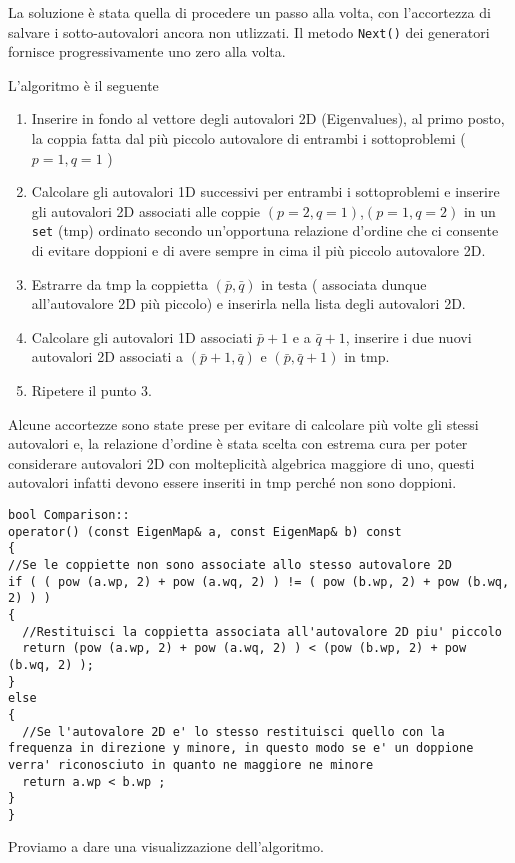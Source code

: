 La soluzione \`e stata quella di procedere un passo alla volta, con l'accortezza di salvare i sotto-autovalori ancora non utlizzati. 
Il metodo \texttt{Next()} dei generatori fornisce progressivamente uno 
zero alla volta.

L'algoritmo \`e il seguente
\begin{enumerate}
 \item Inserire in fondo al vettore degli autovalori 2D (Eigenvalues), al primo posto, la coppia fatta dal pi\`u piccolo autovalore di entrambi i sottoproblemi ( $p=1,q=1$ )
 \item Calcolare gli autovalori 1D successivi  per entrambi i sottoproblemi e inserire gli autovalori 2D associati alle coppie $(p=2,q=1)$,$(p=1,q=2)$
 in un \texttt{set} (tmp) ordinato secondo un'opportuna relazione d'ordine che ci consente di evitare doppioni e di avere sempre in cima il pi\`u 
 piccolo autovalore 2D.
 \item Estrarre da tmp la coppietta $(\bar p,\bar q)$ in testa ( associata dunque all'autovalore 2D pi\`u piccolo) e inserirla nella lista degli autovalori 2D.
 \item Calcolare gli autovalori 1D associati $\bar p +1$ e a $\bar q+1$, inserire i due nuovi autovalori 2D associati a $(\bar p+1,\bar q)$ e $(\bar p,\bar q+1)$ in tmp.
 \item Ripetere il punto 3.
\end{enumerate}

Alcune accortezze sono state prese per evitare di calcolare pi\`u volte gli stessi autovalori e, la relazione d'ordine \`e stata scelta con estrema
cura per poter considerare autovalori 2D con molteplicit\`a algebrica maggiore di uno, questi autovalori infatti devono essere inseriti in tmp perch\'e
non sono doppioni.
\begin{lstlisting}[style = general]
bool Comparison::
operator() (const EigenMap& a, const EigenMap& b) const
{
//Se le coppiette non sono associate allo stesso autovalore 2D
if ( ( pow (a.wp, 2) + pow (a.wq, 2) ) != ( pow (b.wp, 2) + pow (b.wq, 2) ) ) 
{
  //Restituisci la coppietta associata all'autovalore 2D piu' piccolo
  return (pow (a.wp, 2) + pow (a.wq, 2) ) < (pow (b.wp, 2) + pow (b.wq, 2) ); 
}
else
{
  //Se l'autovalore 2D e' lo stesso restituisci quello con la frequenza in direzione y minore, in questo modo se e' un doppione verra' riconosciuto in quanto ne maggiore ne minore
  return a.wp < b.wp ; 
}
}
\end{lstlisting}
\clearpage
Proviamo a dare una visualizzazione dell'algoritmo.

